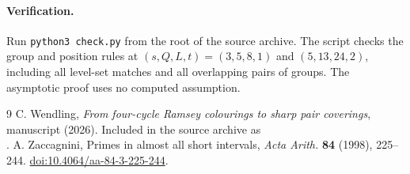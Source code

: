 \documentclass[10pt]{article}
\begin{document}
\paragraph{Verification.} Run \texttt{python3 check.py} from the root of the source archive. The script checks the group and position rules at $(s,Q,L,t)=(3,5,8,1)$ and $(5,13,24,2)$, including all level-set matches and all overlapping pairs of groups. The asymptotic proof uses no computed assumption.

\begin{thebibliography}{9}
 C. Wendling, \emph{From four-cycle Ramsey colourings to sharp pair coverings}, manuscript (2026). Included in the source archive as\\
.
 A. Zaccagnini, Primes in almost all short intervals, \emph{Acta Arith.} \textbf{84} (1998), 225--244. \href{https://doi.org/10.4064/aa-84-3-225-244}{doi:10.4064/aa-84-3-225-244}.
\end{thebibliography}
\end{document}
